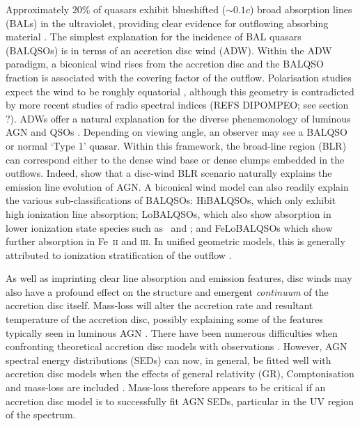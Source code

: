 \documentclass[preprint, a4paper, 11pt]{aastex}
\begin{document}
Approximately $20\%$ of quasars exhibit blueshifted ($\sim 0.1c$)
broad absorption lines (BALs) in the ultraviolet,
providing clear evidence for outflowing absorbing material
\citep{weymann1991, reichard2003, knigge2008, turnermiller2009, allen2011}.
The simplest explanation for the incidence of 
BAL quasars (BALQSOs) is in terms of an accretion disc wind (ADW). 
Within the ADW paradigm, a biconical wind rises from 
the accretion disc and the BALQSO fraction is associated with
the covering factor of the outflow. 
Polarisation studies expect the wind to be roughly equatorial
\citep{goodrich1995, cohen1995}, although this geometry is contradicted
by more recent studies of radio spectral indices (REFS DIPOMPEO; see section ?).
ADWs offer a natural explanation for the
diverse phenemonology of luminous AGN and QSOs \citep[e.g.][]{MCGV95, elvis2000}. 
Depending on viewing angle, an observer 
may see a BALQSO or normal `Type 1' quasar.
Within this framework, the broad-line region (BLR) can 
correspond either to the dense wind base or dense clumps embedded
in the outflows. Indeed, \cite{elitzur2014} show that a disc-wind BLR scenario
naturally explains the emission line evolution of AGN.
A biconical wind model can also readily explain the various sub-classifications of BALQSOs: 
HiBALQSOs, which only exhibit high ionization line absorption; LoBALQSOs, which also show
absorption in lower ionization state species such as \mg\ and \al; and
FeLoBALQSOs which show further absorption in Fe~\textsc{ii} and \textsc{iii}.
In unified geometric models, this is generally attributed to ionization stratification
of the outflow \citep[e.g.][]{elvis2000}.

As well as imprinting clear line absorption and emission
features, disc winds may also have a profound effect on the structure and 
emergent {\em continuum} of the accretion disc itself.
Mass-loss will alter the accretion rate and resultant 
temperature of the accretion disc, possibly explaining some 
of the features typically seen in luminous AGN \citep{knigge1999,laordavis2014}.
There have been numerous difficulties when confronting 
theoretical accretion disc models with observations 
\citep[see e.g.][]{blaes1998}. However, AGN spectral energy distributions (SEDs) can now, 
in general, be fitted well with accretion disc models
when the effects of general relativity (GR), Comptonisation
and mass-loss are included \citep{capellupo2015}. Mass-loss therefore appears to be 
critical if an accretion disc model is to successfully fit AGN SEDs, 
particular in the UV region of the spectrum.
\end{document}
